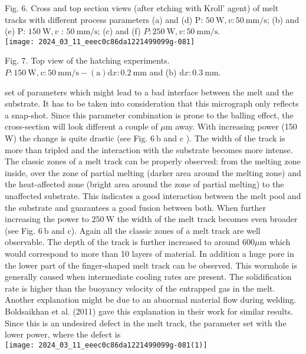 \documentclass[10pt]{article}
\begin{document}
Fig. 6. Cross and top section views (after etching with Kroll' agent) of melt tracks with different process parameters (a) and (d) P: $50 \mathrm{~W}, v: 50 \mathrm{~mm} / \mathrm{s}$; (b) and (e) P: $150 \mathrm{~W}, v$ : $50 \mathrm{~mm} / \mathrm{s}$; (c) and (f) $P: 250 \mathrm{~W}, v: 50 \mathrm{~mm} / \mathrm{s}$.\\
\texttt{[image: 2024\_03\_11\_eeec0c86da1221499099g-081]}

Fig. 7. Top view of the hatching experiments. $P: 150 \mathrm{~W}, v: 50 \mathrm{~mm} / \mathrm{s}-(\mathrm{a}) \mathrm{d} x: 0.2 \mathrm{~mm}$ and (b) $\mathrm{d} x: 0.3 \mathrm{~mm}$.

set of parameters which might lead to a bad interface between the melt and the substrate. It has to be taken into consideration that this micrograph only reflects a snap-shot. Since this parameter combination is prone to the balling effect, the cross-section will look different a couple of $\mu \mathrm{m}$ away. With increasing power (150 W) the change is quite drastic (see Fig. $6 \mathrm{~b}$ and $\mathrm{c}$ ). The width of the track is more than tripled and the interaction with the substrate becomes more intense. The classic zones of a melt track can be properly observed: from the melting zone inside, over the zone of partial melting (darker area around the melting zone) and the heat-affected zone (bright area around the zone of partial melting) to the unaffected substrate. This indicates a good interaction between the melt pool and the substrate and guarantees a good fusion between both. When further increasing the power to $250 \mathrm{~W}$ the width of the melt track becomes even broader (see Fig. $6 \mathrm{~b}$ and c). Again all the classic zones of a melt track are well observable. The depth of the track is further increased to around $600 \mu \mathrm{m}$ which would correspond to more than 10 layers of material. In addition a huge pore in the lower part of the finger-shaped melt track can be observed. This wormhole is generally caused when intermediate cooling rates are present. The solidification rate is higher than the buoyancy velocity of the entrapped gas in the melt. Another explanation might be due to an abnormal material flow during welding. Boldsaikhan et al. (2011) gave this explanation in their work for similar results. Since this is an undesired defect in the melt track, the parameter set with the lower power, where the defect is\\
\texttt{[image: 2024\_03\_11\_eeec0c86da1221499099g-081(1)]}
\end{document}
